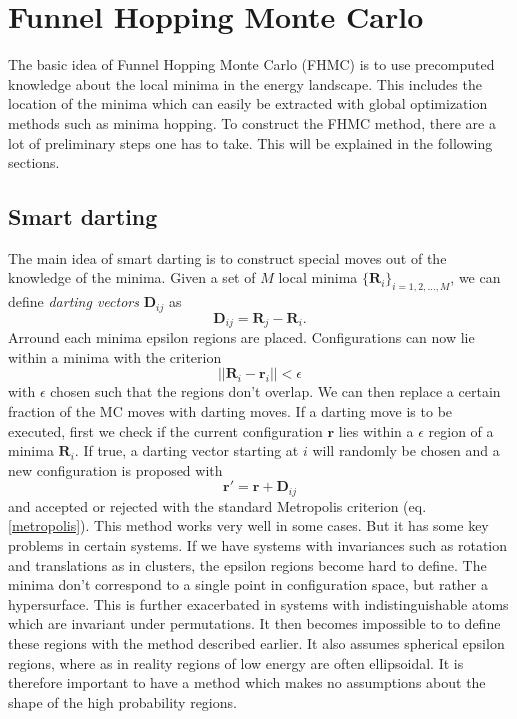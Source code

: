 \documentclass[11pt]{scrartcl} %
\begin{document}
\section{Funnel Hopping Monte Carlo}
The basic idea of Funnel Hopping Monte Carlo (FHMC) is to use precomputed knowledge about the local minima in the energy landscape. This includes the location of the minima which can easily be extracted with global optimization methods such as minima hopping. To construct the FHMC method, there are a lot of preliminary steps one has to take. This will be explained in the following sections.
\subsection{Smart darting}
The main idea of smart darting \cite{Andricioaei2001} is to construct special moves out of the knowledge of the minima. Given a set of $M$ local minima $\{\mathbf{R}_i\}_{i=1,2,\ldots,M}$, we can define \emph{darting vectors} $\mathbf{D}_{ij}$ as 
\begin{equation}
	\mathbf{D}_{ij}=\mathbf{R}_j-\mathbf{R}_i.
\end{equation}
Arround each minima epsilon regions are placed. Configurations can now lie within a minima with the criterion
\begin{equation}
	||\mathbf{R}_i-\mathbf{r}_i||<\epsilon
\end{equation}
with $\epsilon$ chosen such that the regions don't overlap. We can then replace a certain fraction of the MC moves with darting moves. If a darting move is to be executed, first we check if the current configuration $\mathbf{r}$ lies within a $\epsilon$ region of a minima $\mathbf{R}_i$. If true, a darting vector starting at $i$ will randomly be chosen and a new configuration is proposed with
\begin{equation}
	\mathbf{r}'=\mathbf{r}+\mathbf{D}_{ij}
\end{equation}
and accepted or rejected with the standard Metropolis criterion (eq. \ref{metropolis}). This method works very well in some cases. But it has some key problems in certain systems. If we have systems with invariances such as rotation and translations as in clusters, the epsilon regions become hard to define. The minima don't correspond to a single point in configuration space, but rather a hypersurface. This is further exacerbated in systems with indistinguishable atoms which are invariant under permutations. It then becomes impossible to to define these regions with the method described earlier. It also assumes spherical epsilon regions, where as in reality regions of low energy are often ellipsoidal. It is therefore important to have a method which makes no assumptions about the shape of the high probability regions.
\end{document}

